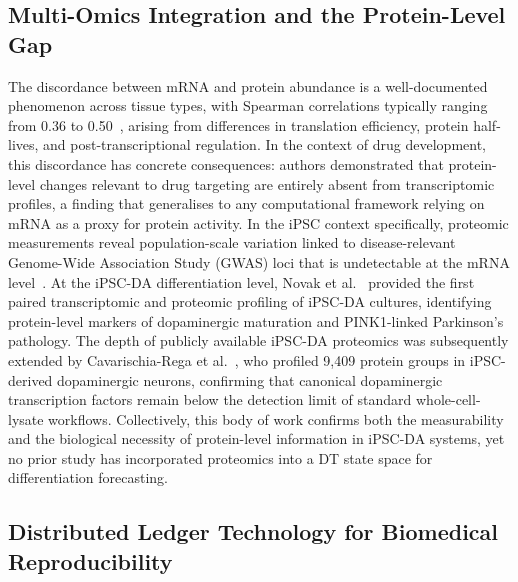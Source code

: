 \documentclass[5p,times,twocolumn]{elsarticle}
\begin{document}
\subsection{\textbf{Multi-Omics Integration and the
Protein-Level Gap}}

The discordance between mRNA and protein abundance
is a well-documented phenomenon across tissue types,
with Spearman correlations typically ranging from
0.36 to 0.50~\cite{kosti2016cross}, arising from
differences in translation efficiency, protein
half-lives, and post-transcriptional
regulation.
In the context of drug development, this discordance
has concrete consequences: authors
\cite{tasaki2022inferring} demonstrated that protein-level
changes relevant to drug targeting are entirely
absent from transcriptomic profiles, a finding
that generalises to any computational framework
relying on mRNA as a proxy for protein activity.
In the iPSC context specifically, proteomic
measurements reveal population-scale variation
linked to disease-relevant Genome-Wide Association Study (GWAS) loci that is
undetectable at the mRNA level~\cite{mirauta2020population}.
At the iPSC-DA differentiation level, Novak et al.\
\cite{novak2022single} provided the first paired
transcriptomic and proteomic profiling of iPSC-DA
cultures, identifying protein-level markers of
dopaminergic maturation and PINK1-linked
Parkinson's pathology.
The depth of publicly available iPSC-DA proteomics
was subsequently extended by Cavarischia-Rega et al.\
\cite{cavarischia2024proteome}, who profiled 9,409
protein groups in iPSC-derived dopaminergic neurons,
confirming that canonical dopaminergic transcription
factors remain below the detection limit of
standard whole-cell-lysate workflows.
Collectively, this body of work confirms both the
measurability and the biological necessity of
protein-level information in iPSC-DA systems,
yet no prior study has incorporated proteomics
into a DT state space for differentiation
forecasting.

\subsection{\textbf{Distributed Ledger Technology for
Biomedical Reproducibility}}
\label{sec:rw_dlt}
\end{document}
